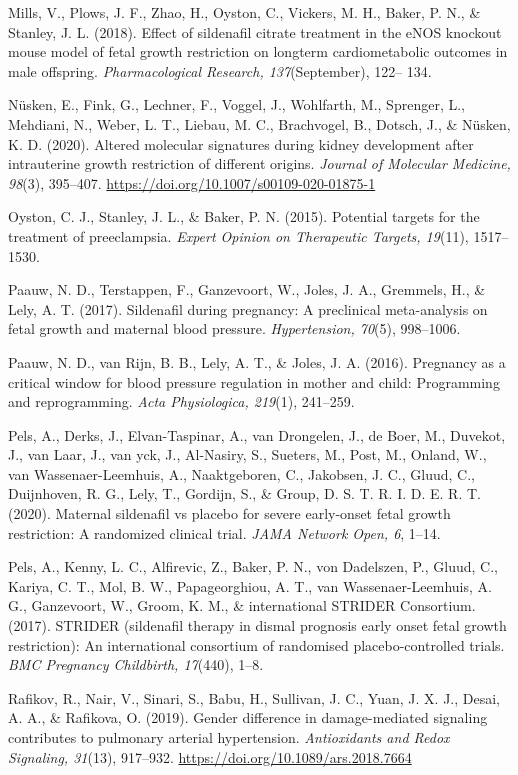 \documentclass[authordate, empirical]{jote-new-article}
\begin{document}
Mills, V., Plows, J. F., Zhao, H., Oyston, C., Vickers, M. H., Baker, P. N., \& Stanley, J. L. (2018). Effect of sildenafil citrate treatment in the eNOS knockout mouse model of fetal growth restriction on longterm cardiometabolic outcomes in male offspring. \emph{Pharmacological Research, 137}(September), 122–
134.

Nüsken, E., Fink, G., Lechner, F., Voggel, J., Wohlfarth, M., Sprenger, L., Mehdiani, N., Weber, L. T., Liebau, M. C., Brachvogel, B., Dotsch, J., \& Nüsken, K. D. (2020). Altered molecular signatures during kidney development after intrauterine growth restriction of different origins. \emph{Journal of Molecular Medicine, 98}(3), 395–407. \url{https://doi.org/10.1007/s00109-020-01875-1}

Oyston, C. J., Stanley, J. L., \& Baker, P. N. (2015). Potential targets for the treatment of preeclampsia. \emph{Expert Opinion on Therapeutic Targets, 19}(11), 1517–1530.

Paauw, N. D., Terstappen, F., Ganzevoort, W., Joles, J. A., Gremmels, H., \& Lely, A. T. (2017). Sildenafil during pregnancy: A preclinical meta-analysis on fetal growth and maternal blood pressure. \emph{Hypertension, 70}(5), 998–1006.

Paauw, N. D., van Rijn, B. B., Lely, A. T., \& Joles, J. A. (2016). Pregnancy as a critical window for blood pressure regulation in mother and child: Programming and reprogramming. \emph{Acta Physiologica, 219}(1), 241–259.

Pels, A., Derks, J., Elvan-Taspinar, A., van Drongelen, J., de Boer, M., Duvekot, J., van Laar, J., van yck, J., Al-Nasiry, S., Sueters, M., Post, M., Onland, W., van Wassenaer-Leemhuis, A., Naaktgeboren, C., Jakobsen, J. C., Gluud, C., Duijnhoven, R. G., Lely, T., Gordijn, S., \& Group, D. S. T. R. I. D. E. R. T. (2020). Maternal sildenafil vs placebo for severe early-onset fetal growth restriction: A randomized clinical trial. \emph{JAMA Network Open, 6}, 1–14.

Pels, A., Kenny, L. C., Alfirevic, Z., Baker, P. N., von Dadelszen, P., Gluud, C., Kariya, C. T., Mol, B. W., Papageorghiou, A. T., van Wassenaer-Leemhuis, A. G., Ganzevoort, W., Groom, K. M., \& international STRIDER Consortium. (2017). STRIDER (sildenafil therapy in dismal prognosis early onset fetal growth restriction): An international consortium of randomised placebo-controlled trials. \emph{BMC Pregnancy Childbirth, 17}(440), 1–8.

Rafikov, R., Nair, V., Sinari, S., Babu, H., Sullivan, J. C., Yuan, J. X. J., Desai, A. A., \& Rafikova, O. (2019). Gender difference in damage-mediated signaling contributes to pulmonary arterial hypertension. \emph{Antioxidants and Redox Signaling, 31}(13), 917–932. \url{https://doi.org/10.1089/ars.2018.7664}
\end{document}
